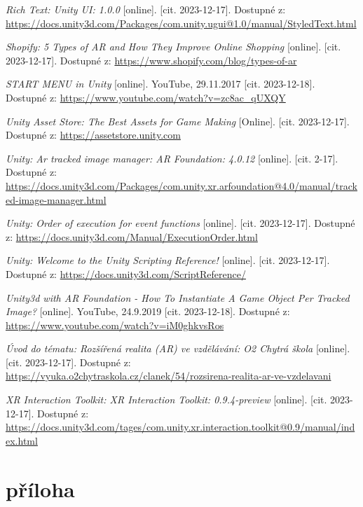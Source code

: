 \documentclass[12pt, a4paper,
twoside,        %
openright
]{report}
\begin{document}
\begin{thebibliography}{99}
\textit{Rich Text: Unity UI: 1.0.0} [online]. [cit. 2023-12-17]. Dostupné z: \url{https://docs.unity3d.com/Packages/com.unity.ugui@1.0/manual/StyledText.html}

\textit{Shopify: 5 Types of AR and How They Improve Online Shopping} [online]. [cit. 2023-12-17]. Dostupné z: \url{https://www.shopify.com/blog/types-of-ar}	

 \textit{START MENU in Unity} [online]. YouTube, 29.11.2017 [cit. 2023-12-18]. Dostupné z: \url{https://www.youtube.com/watch?v=zc8ac_qUXQY}

\textit{Unity Asset Store: The Best Assets for Game Making} [Online]. [cit. 2023-12-17]. Dostupné z: \url{https://assetstore.unity.com}

\textit{Unity: Ar tracked image manager: AR Foundation: 4.0.12} [online]. [cit. 2-17]. Dostupné z: \url{https://docs.unity3d.com/Packages/com.unity.xr.arfoundation@4.0/manual/tracked-image-manager.html}

\textit{Unity: Order of execution for event functions} [online]. [cit. 2023-12-17]. Dostupné z: \url{https://docs.unity3d.com/Manual/ExecutionOrder.html}

\textit{Unity: Welcome to the Unity Scripting Reference!} [online]. [cit. 2023-12-17]. Dostupné z: \url{https://docs.unity3d.com/ScriptReference/}

 \textit{Unity3d with AR Foundation - How To Instantiate A Game Object Per Tracked Image?} [online]. YouTube, 24.9.2019 [cit. 2023-12-18]. Dostupné z: \url{https://www.youtube.com/watch?v=iM0ghkvsRos}

\textit{Úvod do tématu: Rozšířená realita (AR) ve vzdělávání: O2 Chytrá škola} [online]. [cit. 2023-12-17]. Dostupné z: \url{https://vyuka.o2chytraskola.cz/clanek/54/rozsirena-realita-ar-ve-vzdelavani}

\textit{XR Interaction Toolkit: XR Interaction Toolkit: 0.9.4-preview} [online]. [cit. 2023-12-17]. Dostupné z: \url{https://docs.unity3d.com/tages/com.unity.xr.interaction.toolkit@0.9/manual/index.html}



\end{thebibliography}

\listoffigures

\listoftables

\appendix %

[\vspace{-22pt}] %


\chapter*{příloha}
\end{document}
